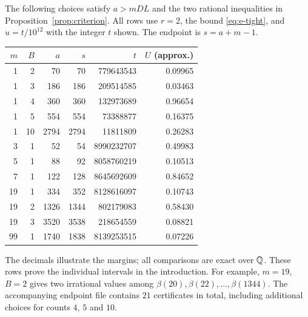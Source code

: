 The following choices satisfy $a>mDL$ and the two rational
inequalities in Proposition~\ref{prop:criterion}.
All rows use $r=2$, the bound \eqref{eq:e-tight}, and
$u=t/10^{12}$ with the integer $t$ shown.
The endpoint is $s=a+m-1$.
\begin{center}
\begin{tabular}{@{}rrrrrr@{}}
\toprule
$m$&$B$&$a$&$s$&$t$&$U$ (approx.)\\
\midrule
1&2&70&70&779643543&0.09965\\
1&3&186&186&209514585&0.03463\\
1&4&360&360&132973689&0.96654\\
1&5&554&554&73388877&0.16375\\
1&10&2794&2794&11811809&0.26283\\
3&1&52&54&8990232707&0.49983\\
5&1&88&92&8058760219&0.10513\\
7&1&122&128&8645692609&0.84652\\
19&1&334&352&8128616097&0.10743\\
19&2&1326&1344&802179083&0.58430\\
19&3&3520&3538&218654559&0.08821\\
99&1&1740&1838&8139253515&0.07226\\
\bottomrule
\end{tabular}
\end{center}
The decimals illustrate the margins; all comparisons are exact
over $\mathbb Q$. These rows prove the individual intervals in the
introduction. For example, $m=19$, $B=2$ gives two irrational
values among $\beta(20),\beta(22),\ldots,\beta(1344)$.
The accompanying endpoint file contains $21$ certificates in
total, including additional choices for counts $4$, $5$ and $10$.
